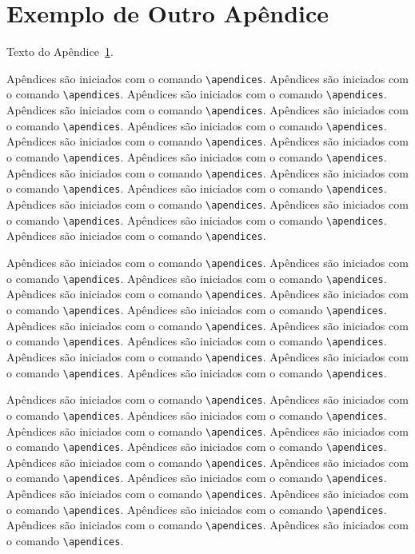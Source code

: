 \chapter{Exemplo de Outro Apêndice}\label{apend:2}

Texto do Apêndice~\ref{apend:2}.

Apêndices são iniciados com o comando \verb|\apendices|.
Apêndices são iniciados com o comando \verb|\apendices|.
Apêndices são iniciados com o comando \verb|\apendices|.
Apêndices são iniciados com o comando \verb|\apendices|.
Apêndices são iniciados com o comando \verb|\apendices|.
Apêndices são iniciados com o comando \verb|\apendices|.
Apêndices são iniciados com o comando \verb|\apendices|.
Apêndices são iniciados com o comando \verb|\apendices|.
Apêndices são iniciados com o comando \verb|\apendices|.
Apêndices são iniciados com o comando \verb|\apendices|.
Apêndices são iniciados com o comando \verb|\apendices|.
Apêndices são iniciados com o comando \verb|\apendices|.
Apêndices são iniciados com o comando \verb|\apendices|.
Apêndices são iniciados com o comando \verb|\apendices|.
Apêndices são iniciados com o comando \verb|\apendices|.
Apêndices são iniciados com o comando \verb|\apendices|.

Apêndices são iniciados com o comando \verb|\apendices|.
Apêndices são iniciados com o comando \verb|\apendices|.
Apêndices são iniciados com o comando \verb|\apendices|.
Apêndices são iniciados com o comando \verb|\apendices|.
Apêndices são iniciados com o comando \verb|\apendices|.
Apêndices são iniciados com o comando \verb|\apendices|.
Apêndices são iniciados com o comando \verb|\apendices|.
Apêndices são iniciados com o comando \verb|\apendices|.
Apêndices são iniciados com o comando \verb|\apendices|.
Apêndices são iniciados com o comando \verb|\apendices|.
Apêndices são iniciados com o comando \verb|\apendices|.
Apêndices são iniciados com o comando \verb|\apendices|.

Apêndices são iniciados com o comando \verb|\apendices|.
Apêndices são iniciados com o comando \verb|\apendices|.
Apêndices são iniciados com o comando \verb|\apendices|.
Apêndices são iniciados com o comando \verb|\apendices|.
Apêndices são iniciados com o comando \verb|\apendices|.
Apêndices são iniciados com o comando \verb|\apendices|.
Apêndices são iniciados com o comando \verb|\apendices|.
Apêndices são iniciados com o comando \verb|\apendices|.
Apêndices são iniciados com o comando \verb|\apendices|.
Apêndices são iniciados com o comando \verb|\apendices|.
Apêndices são iniciados com o comando \verb|\apendices|.
Apêndices são iniciados com o comando \verb|\apendices|.
Apêndices são iniciados com o comando \verb|\apendices|.
Apêndices são iniciados com o comando \verb|\apendices|.

